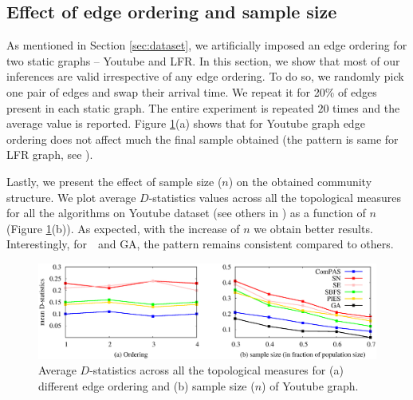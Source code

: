  
\subsection{Effect of edge ordering and sample size}\label{sec:effect}
As mentioned in Section \ref{sec:dataset}, we artificially imposed an edge ordering for two static graphs -- Youtube and LFR. In this section, we show that most of our inferences are valid irrespective of any edge ordering. To do so, we randomly pick one pair of edges and swap their arrival time. We repeat it for 20\% of  edges present in each static graph. The entire experiment is repeated $20$ times and the average value is reported. Figure \ref{param_est_1}(a) shows that for Youtube graph edge ordering does not affect much the final sample obtained (the pattern is same for LFR graph, see \cite{si}). 


Lastly, we present the effect of sample size ($n$) on the obtained community structure. We plot average $D$-statistics values across all the topological measures for all the algorithms on Youtube dataset (see others in \cite{si}) as a function of $n$ (Figure \ref{param_est_1}(b)). As expected, with the increase of $n$ we obtain better results. Interestingly, for~\compas~and GA, the pattern remains consistent compared to others.

\begin{figure}[!h]
\centering
\includegraphics[scale = 0.4]{./texfiles/Chapter_2/figures/param_estimate_1.eps}
\caption{\label{param_est_1}Average $D$-statistics across all the topological measures for (a) different edge ordering and (b) sample size ($n$) of Youtube graph.}
\end{figure}







